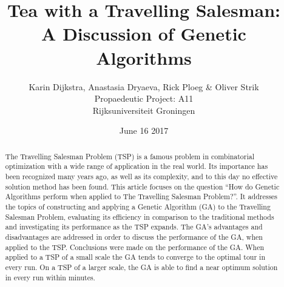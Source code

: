 \documentclass[11pt,a4paper]{article}
\title{Tea with a Travelling Salesman:\\
	\large A Discussion of Genetic Algorithms}
\author{Karin Dijkstra, Anastasia Dryaeva, Rick Ploeg \& Oliver Strik\\
Propaedeutic Project: A11\\
Rijksuniversiteit Groningen}
\date{June 16 2017}
\begin{document}
\maketitle
\clearpage
\begin{abstract}
\noindent
The Travelling Salesman Problem (TSP) is a famous problem in combinatorial optimization with a wide range of application in the real world. Its importance has been recognized many years ago, as well as its complexity, and to this day no effective solution method has been found. This article focuses on the question ``How do Genetic Algorithms perform when applied to The Travelling Salesman Problem?''. It addresses the topics of constructing and applying a Genetic Algorithm (GA) to the Travelling Salesman Problem, evaluating its efficiency in comparison to the traditional methods and investigating its performance as the TSP expands. The GA's advantages and disadvantages are addressed in order to discuss the performance of the GA, when applied to the TSP. Conclusions were made on the performance of the GA. When applied to a TSP of a small scale the GA tends to converge to the optimal tour in every run. On a TSP of a larger scale, the GA is able to find a near optimum solution in every run within minutes.
\end{abstract}

\clearpage
\tableofcontents










\appendix

\end{document}
